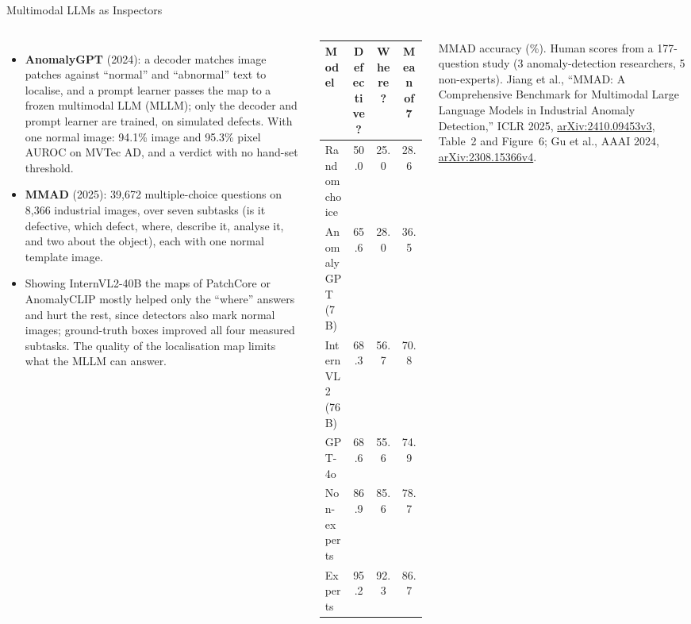 \begin{frame}{Multimodal LLMs as Inspectors}
  \begin{columns}[T,onlytextwidth]
      \begin{itemize}\footnotesize\itemsep0.3em
        \item \textbf{AnomalyGPT} (2024): a decoder matches image patches against ``normal'' and ``abnormal'' text to localise, and a prompt learner passes the map to a frozen multimodal LLM (MLLM); only the decoder and prompt learner are trained, on simulated defects. With one normal image: 94.1\% image and 95.3\% pixel AUROC on MVTec AD, and a verdict with no hand-set threshold.
        \item \textbf{MMAD} (2025): 39,672 multiple-choice questions on 8,366 industrial images, over seven subtasks (is it defective, which defect, where, describe it, analyse it, and two about the object), each with one normal template image.
        \item Showing InternVL2-40B the maps of PatchCore or AnomalyCLIP mostly helped only the ``where'' answers and hurt the rest, since detectors also mark normal images; ground-truth boxes improved all four measured subtasks. The quality of the localisation map limits what the MLLM can answer.
      \end{itemize}
      \centering
      \vspace{0.6em}
      {\scriptsize\setlength{\tabcolsep}{4pt}
      \begin{tabular}{l c c c}
        \toprule
        \textbf{Model} & \textbf{Defective?} & \textbf{Where?} & \textbf{Mean of 7} \\
        \midrule
        Random choice & 50.0 & 25.0 & 28.6 \\
        AnomalyGPT (7B) & 65.6 & 28.0 & 36.5 \\
        InternVL2 (76B) & 68.3 & 56.7 & 70.8 \\
        GPT-4o & 68.6 & 55.6 & 74.9 \\
        \addlinespace[0.25em]
        Non-experts & 86.9 & 85.6 & 78.7 \\
        Experts & 95.2 & 92.3 & 86.7 \\
        \bottomrule
      \end{tabular}\par}
      \vspace{0.4em}
      {\scriptsize MMAD accuracy (\%). Human scores from a 177-question study (3 anomaly-detection researchers, 5 non-experts). Jiang et al., ``MMAD: A Comprehensive Benchmark for Multimodal Large Language Models in Industrial Anomaly Detection,'' ICLR 2025, \href{https://arxiv.org/abs/2410.09453v3}{arXiv:2410.09453v3}, Table~2 and Figure~6; Gu et al., AAAI 2024, \href{https://arxiv.org/abs/2308.15366v4}{arXiv:2308.15366v4}.\par}
  \end{columns}
\end{frame}

